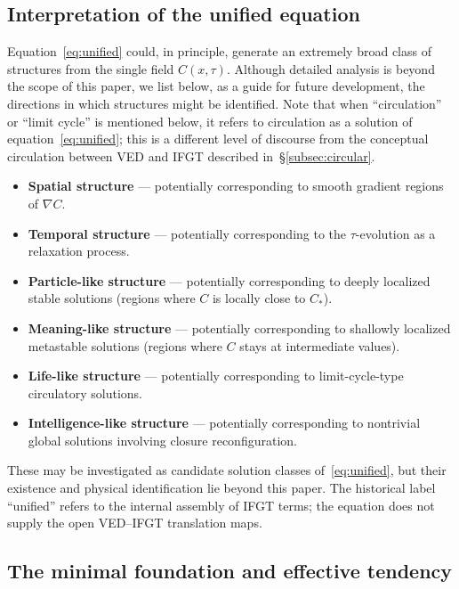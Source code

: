 \subsection{Interpretation of the unified equation}
\label{subsec:interpretation}

Equation~\eqref{eq:unified} could, in principle, generate an extremely broad class of structures from the single field $C(x,\tau)$. Although detailed analysis is beyond the scope of this paper, we list below, as a guide for future development, the directions in which structures might be identified. Note that when ``circulation'' or ``limit cycle'' is mentioned below, it refers to circulation as a solution of equation~\eqref{eq:unified}; this is a different level of discourse from the conceptual circulation between VED and IFGT described in~§\ref{subsec:circular}.

\begin{itemize}
  \item \textbf{Spatial structure} --- potentially corresponding to smooth gradient regions of $\nabla C$.
  \item \textbf{Temporal structure} --- potentially corresponding to the $\tau$-evolution as a relaxation process.
  \item \textbf{Particle-like structure} --- potentially corresponding to deeply localized stable solutions (regions where $C$ is locally close to $C_*$).
  \item \textbf{Meaning-like structure} --- potentially corresponding to shallowly localized metastable solutions (regions where $C$ stays at intermediate values).
  \item \textbf{Life-like structure} --- potentially corresponding to limit-cycle-type circulatory solutions.
  \item \textbf{Intelligence-like structure} --- potentially corresponding to nontrivial global solutions involving closure reconfiguration.
\end{itemize}

These may be investigated as candidate solution classes of~\eqref{eq:unified},
but their existence and physical identification lie beyond this paper.  The
historical label ``unified'' refers to the internal assembly of IFGT terms;
the equation does not supply the open VED--IFGT translation maps.

\subsection{The minimal foundation and effective tendency}
\label{subsec:minimal_axioms}

